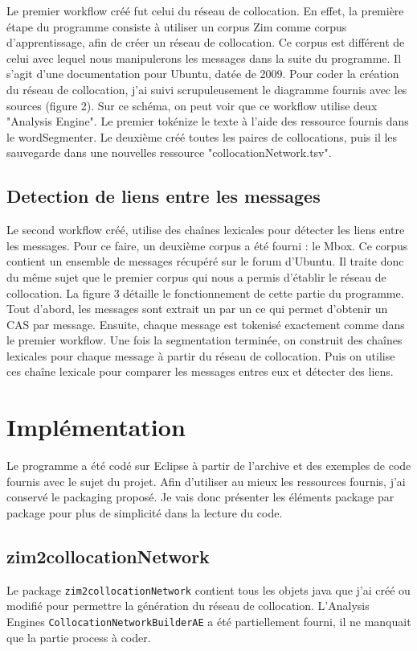 \documentclass[a4paper]{article}
\begin{document}
	Le premier workflow créé fut celui du réseau de collocation. En effet, la première étape du programme consiste à utiliser un corpus Zim comme corpus d'apprentissage, afin de créer un réseau de collocation. Ce corpus est différent de celui avec lequel nous manipulerons les messages dans la suite du programme. Il s'agit d'une documentation pour Ubuntu, datée de 2009. Pour coder la création du réseau de collocation, j'ai suivi scrupuleusement le diagramme fournis avec les sources (figure 2). Sur ce schéma, on peut voir que ce workflow utilise deux "Analysis Engine". Le premier tokénize le texte à l'aide des ressource fournis dans le wordSegmenter. Le deuxième créé toutes les paires de collocations, puis il les sauvegarde dans une nouvelles ressource "collocationNetwork.tsv".

	\subsection{Detection de liens entre les messages}

	Le second workflow créé, utilise des chaînes lexicales pour détecter les liens entre les messages. Pour ce faire, un deuxième corpus a été fourni : le Mbox. Ce corpus contient un ensemble de messages récupéré sur le forum d'Ubuntu. Il traite donc du même sujet que le premier corpus qui nous a permis d’établir le réseau de collocation. La figure 3 détaille le fonctionnement de cette partie du programme. Tout d'abord, les messages sont extrait un par un ce qui permet d'obtenir un CAS par message. Ensuite, chaque message est tokenisé exactement comme dans le premier workflow. Une fois la segmentation terminée, on construit des chaînes lexicales pour chaque message à partir du réseau de collocation. Puis on utilise ces chaîne lexicale pour comparer les messages entres eux et détecter des liens.
	
	\section{Implémentation}

Le programme a été codé sur Eclipse à partir de l'archive et des exemples de code fournis avec le sujet du projet. Afin d'utiliser au mieux les ressources fournis, j'ai conservé le packaging proposé. Je vais donc présenter les éléments package par package pour plus de simplicité dans la lecture du code. 

	\subsection{zim2collocationNetwork}
	Le package \texttt{zim2collocationNetwork} contient tous les objets java que j'ai créé ou modifié pour permettre la génération du réseau de collocation. L'Analysis Engines \texttt{CollocationNetworkBuilderAE} a été partiellement fourni, il ne manquait que la partie process à coder.
\end{document}
